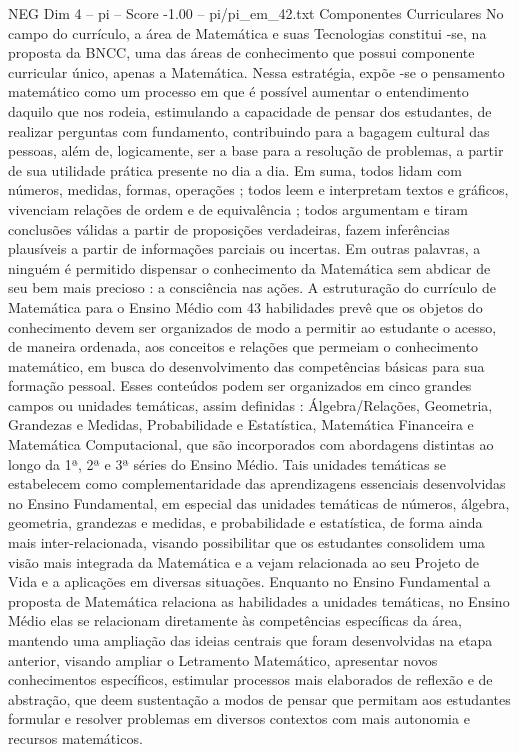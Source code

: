 \begin{textsample}{NEG Dim 4 – pi – Score -1.00 – pi/pi\_em\_42.txt}  \label{ex:f4_neg_168}
Componentes Curriculares No campo do currículo, a área de Matemática e suas Tecnologias constitui -se, na proposta da BNCC, uma das áreas de conhecimento que possui componente curricular único, apenas a Matemática.
Nessa estratégia, expõe -se o pensamento matemático como um processo em que é possível aumentar o entendimento daquilo que nos rodeia, estimulando a capacidade de pensar dos estudantes, de realizar perguntas com fundamento, contribuindo para a bagagem cultural das pessoas, além de, logicamente, ser a base para a resolução de problemas, a partir de sua utilidade prática presente no dia a dia.
Em suma, todos lidam com números, medidas, formas, operações ; todos leem e interpretam textos e gráficos, vivenciam relações de ordem e de equivalência ; todos argumentam e tiram conclusões válidas a partir de proposições verdadeiras, fazem inferências plausíveis a partir de informações parciais ou incertas.
Em outras palavras, a ninguém é permitido dispensar o conhecimento da Matemática sem abdicar de seu bem mais precioso : a consciência nas ações.
A estruturação do currículo de Matemática para o Ensino Médio com 43 habilidades prevê que os objetos do conhecimento devem ser organizados de modo a permitir ao estudante o acesso, de maneira ordenada, aos conceitos e relações que permeiam o conhecimento matemático, em busca do desenvolvimento das competências básicas para sua formação pessoal.
Esses conteúdos podem ser organizados em cinco grandes campos ou unidades temáticas, assim definidas : Álgebra/Relações, Geometria, Grandezas e Medidas, Probabilidade e Estatística, Matemática Financeira e Matemática Computacional, que são incorporados com abordagens distintas ao longo da 1ª, 2ª e 3ª séries do Ensino Médio.
Tais unidades temáticas se estabelecem como complementaridade das aprendizagens essenciais desenvolvidas no Ensino Fundamental, em especial das unidades temáticas de números, álgebra, geometria, grandezas e medidas, e probabilidade e estatística, de forma ainda mais inter-relacionada, visando possibilitar que os estudantes consolidem uma visão mais integrada da Matemática e a vejam relacionada ao seu Projeto de Vida e a aplicações em diversas situações.
Enquanto no Ensino Fundamental a proposta de Matemática relaciona as habilidades a unidades temáticas, no Ensino Médio elas se relacionam diretamente às competências específicas da área, mantendo uma ampliação das ideias centrais que foram desenvolvidas na etapa anterior, visando ampliar o Letramento Matemático, apresentar novos conhecimentos específicos, estimular processos mais elaborados de reflexão e de abstração, que deem sustentação a modos de pensar que permitam aos estudantes formular e resolver problemas em diversos contextos com mais autonomia e recursos matemáticos.

\end{textsample}
